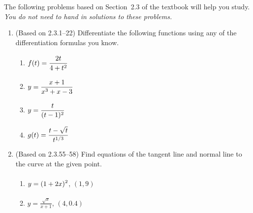 \documentclass{article}
\title{\commonPSTitleZeroTwoThree}
\author{\commonAuthor}
\date{\commonDateZeroTwoThree}
\newcommand{\ds}{\displaystyle}
\begin{document}
\maketitle
\thispagestyle{empty}

\noindent
The following problems based on Section~2.3 of the textbook will help
you study.  \emph{You do not need to hand in solutions to these
  problems.}
\begin{enumerate}
\item (Based on 2.3.1--22) %
  Differentiate the following functions using any of the
  differentiation formulas you know.
  \begin{multicols}{4}
  \begin{enumerate}
  \item $\ds f(t)= \frac{2t}{4+t^2} \vphantom{\frac{\sqrt{t}}{t^{1/3}}}$
  \item $\ds y=\frac{x+1}{x^3+x-3}
    \vphantom{\frac{\sqrt{t}}{t^{1/3}}}$
  \item $\ds y=\frac{t}{(t-1)^2}
    \vphantom{\frac{\sqrt{t}}{t^{1/3}}}$
  \item $\ds g(t)=\frac{t-\sqrt{t}}{t^{1/3}}
    \vphantom{\frac{\sqrt{t}}{t^{1/3}}}$
  \end{enumerate}
  \end{multicols}
\item (Based on 2.3.55--58)
  Find equations of the tangent line and normal line to the curve
  at the given point.
  \begin{multicols}{2}
  \begin{enumerate}
  \item $\ds y = (1+2x)^2 \vphantom{\frac{\sqrt{x}}{x}}$, $(1,9)$
  \item $\ds y = \frac{\sqrt{x}}{x+1}$, $(4,0.4)$
  \end{enumerate}
  \end{multicols}

\end{enumerate}
\end{document}
